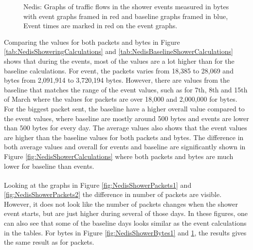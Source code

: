 \begin{figure}[H]
\begin{subfigure}[b]{0.47\textwidth}
    \end{subfigure}
        \begin{subfigure}[b]{0.47\textwidth}
        \centering
    \end{subfigure}
    \begin{subfigure}[b]{0.47\textwidth}
        \centering
    \end{subfigure}
    \begin{subfigure}[b]{0.47\textwidth}
        \centering
    \end{subfigure}
    \hspace{0.6cm}
    \begin{subfigure}[b]{0.47\textwidth}
    \centering
        \end{subfigure}
    \caption{Nedis: Graphs of traffic flows in the shower events measured in bytes with event graphs framed in red and baseline graphs framed in blue, Event times are marked in red on the event graphs.}  
    \label{fig:NedisShowerBytes2}
\end{figure}

Comparing the values for both packets and bytes in Figure \ref{tab:NedisShoweringCalculations} and \ref{tab:NedisBaselineShowerCalculations} shows that during the events, most of the values are a lot higher than for the baseline calculations. For event, the packets varies from 18,385 to 28,069 and bytes from 2,091,914 to 3,720,194 bytes. However, there are values from the baseline that matches the range of the event values, such as for 7th, 8th and 15th of March where the values for packets are over 18,000 and 2,000,000 for bytes. For the biggest packet sent, the baseline have a higher overall value compared to the event values, where baseline are mostly around 500 bytes and events are lower than 500 bytes for every day. The average values also shows that the event values are higher than the baseline values for both packets and bytes. The difference in both average values and overall for events and baseline are significantly shown in Figure \ref{fig:NedisShowerCalculations} where both packets and bytes are much lower for baseline than events. 
\\\\
Looking at the graphs in Figure \ref{fig:NedisShowerPackets1} and \ref{fig:NedisShowerPackets2} the difference in number of packets are visible. However, it does not look like the number of packets changes when the shower event starts, but are just higher during several of those days. In these figures, one can also see that some of the baseline days looks similar as the event calculations in the tables. For bytes in Figure \ref{fig:NedisShowerBytes1} and \ref{fig:NedisShowerBytes2}, the results gives the same result as for packets. 

